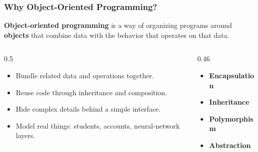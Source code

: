 \documentclass[aspectratio=169,10pt]{beamer}
\newcommand{\keyword}[1]{\textcolor{PrimaryBlue}{\textbf{#1}}}
\begin{document}
\begin{frame}[fragile]
\frametitle{Why Object-Oriented Programming?}
\small
\keyword{Object-oriented programming} is a way of organizing programs around \keyword{objects} that combine data with the behavior that operates on that data.

\vspace{0.18cm}
\begin{columns}[T,totalwidth=0.96\textwidth]
\begin{column}{0.5\textwidth}
\begin{itemize}\setlength\itemsep{0.06cm}
  \item Bundle related data and operations together.
  \item Reuse code through inheritance and composition.
  \item Hide complex details behind a simple interface.
  \item Model real things: students, accounts, neural-network layers.
\end{itemize}
\end{column}
\begin{column}{0.46\textwidth}
\begin{tcolorbox}[lecturebox,title=The four pillars]
\begin{itemize}\setlength\itemsep{0.05cm}
  \item \keyword{Encapsulation}
  \item \keyword{Inheritance}
  \item \keyword{Polymorphism}
  \item \keyword{Abstraction}
\end{itemize}
\end{tcolorbox}
\end{column}
\end{columns}
\end{frame}
\end{document}
